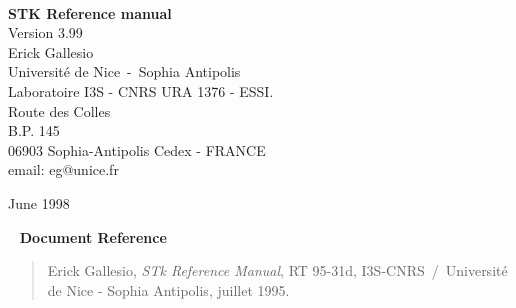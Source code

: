 \documentclass[11pt,a4paper]{book}
\begin{document}
\parindent 0pt                          %


%
% 
\renewcommand{\thechapter}{}                    %
\renewcommand{\thesection}{\arabic{section}}    %

%
%
\newcommand{\stkversion}{3.99}
\newcommand{\stk}{{\sc STk}}
\newcommand{\stklos}{{\sc STklos}}
\newcommand{\doc}{{\em Identical to R$^{4}$RS.}}
\newcommand{\rrrr}{{\em R$^{4}\!RS$}}
\newcommand{\rthree}{{\em R$^{3}\!RS$}}
\newcommand{\rfour}{{\em R$^{4}\!RS$}}
\newcommand{\rfive}{{\em R$^{5}\!RS$}}
\newcommand{\saut}{\vskip2mm}
\newcommand{\tilda}{{\tt\char126}}
\newcommand{\etoile}{{\tt\char42}}
\newcommand{\leftbracket}{{\tt\char91}}
\newcommand{\rightbracket}{{\tt\char93}}
\newcommand{\hyperiii}[1]{\hyper{#1$_3$}}
\newcommand{\clearemptydoublepage}{\newpage{\thispagestyle{empty}\cleardoublepage}}

%
%
\thispagestyle{empty}
\begin{center}   
\ \\[3cm]
{\huge\bf ST{\large\bf{K}} Reference manual}\\[3mm]
{\Large Version \stkversion}\\[3cm]
{\large Erick Gallesio \\
Universit\'e de Nice~-~Sophia Antipolis \\
Laboratoire I3S - CNRS URA 1376 - ESSI. \\
Route des Colles\\
B.P. 145\\
06903 Sophia-Antipolis Cedex - FRANCE\\[3mm]
email: eg@unice.fr}
\end{center}
\vskip8cm
\begin{flushright}
June 1998
\end{flushright}
\newpage
\thispagestyle{empty}
{\ }
\vskip2cm
{\bf Document Reference}
\begin{quote}
Erick Gallesio, {\em STk Reference Manual}, RT 95-31d,
I3S-CNRS~/~Universit\'e de Nice - Sophia Antipolis, juillet 1995.
\end{quote}
\end{document}

